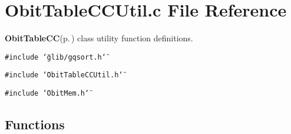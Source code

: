 \section{Obit\-Table\-CCUtil.c File Reference}
\label{ObitTableCCUtil_8c}
{\bf Obit\-Table\-CC}{\rm (p.\,\pageref{structObitTableCC})} class utility function definitions. 

{\tt \#include \char`\"{}glib/gqsort.h\char`\"{}}\par
{\tt \#include \char`\"{}Obit\-Table\-CCUtil.h\char`\"{}}\par
{\tt \#include \char`\"{}Obit\-Mem.h\char`\"{}}\par
\subsection*{Functions}
